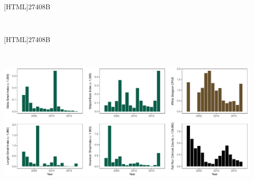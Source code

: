 \documentclass[]{article}\usepackage[]{graphicx}\usepackage[]{color}
\makeatletter
\def\maxwidth{ %
  \ifdim\Gin@nat@width>\linewidth
    \linewidth
  \else
    \Gin@nat@width
  \fi
}
\makeatother
\begin{document}
\vspace{0cm}

\begin{Row}
   \begin{Cell}{1}
			\hspace{35pt}
			\begin{minipage}{466pt}
				[HTML]{27408B}{\parbox[c][12pt]{\textwidth}{
					\begin{center}
						{\LARGE \textcolor{white}{Fall Midwater Trawl}}
					\end{center}
				}}
			\end{minipage}%
			\hspace{52pt}
			\begin{minipage}{205pt}
				[HTML]{27408B}{\parbox[c][12pt]{\textwidth}{
					\begin{center}
						{\LARGE \textcolor{white}{Other Surveys}}
					\end{center}
				}}
			\end{minipage}
   \end{Cell}
\end{Row}

\vspace{-0.2cm}

\begin{Row}
    \begin{Cell}{1}


{\centering \includegraphics[width=\maxwidth]{figures/fish2_main_fig-1} 

}



		\end{Cell}
\end{Row}

\vspace{0.2cm}
\end{document}
